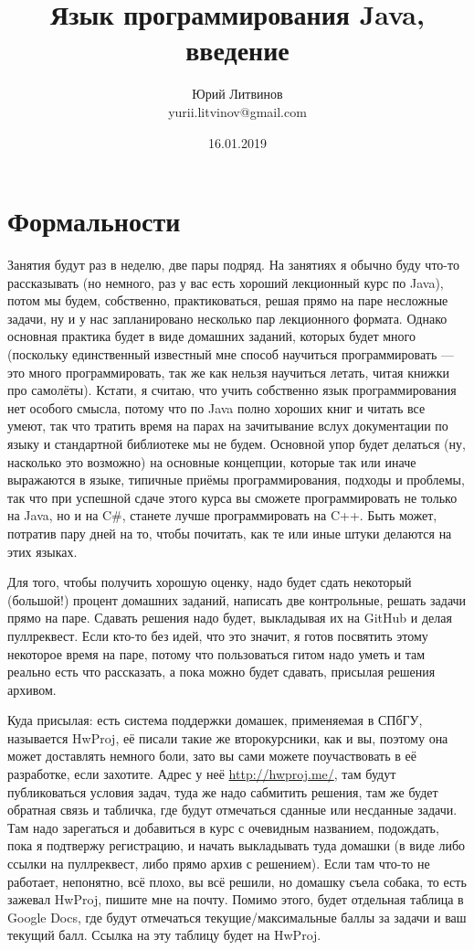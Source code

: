 \documentclass[a5paper]{article}
\title{Язык программирования Java, введение}
\author{Юрий Литвинов\\\small{yurii.litvinov@gmail.com}}
\date{16.01.2019}
\begin{document}
\maketitle
\thispagestyle{empty}

\section{Формальности}

Занятия будут раз в неделю, две пары подряд. На занятиях я обычно буду что-то рассказывать (но немного, раз у вас есть хороший лекционный курс по Java), потом мы будем, собственно, практиковаться, решая прямо на паре несложные задачи, ну и у нас запланировано несколько пар лекционного формата. Однако основная практика будет в виде домашних заданий, которых будет много (поскольку единственный известный мне способ научиться программировать --- это много программировать, так же как нельзя научиться летать, читая книжки про самолёты). Кстати, я считаю, что учить собственно язык программирования нет особого смысла, потому что по Java полно хороших книг и читать все умеют, так что тратить время на парах на зачитывание вслух документации по языку и стандартной библиотеке мы не будем. Основной упор будет делаться (ну, насколько это возможно) на основные концепции, которые так или иначе выражаются в языке, типичные приёмы программирования, подходы и проблемы, так что при успешной сдаче этого курса вы сможете программировать не только на Java, но и на C\#, станете лучше программировать на C++. Быть может, потратив пару дней на то, чтобы почитать, как те или иные штуки делаются на этих языках.

Для того, чтобы получить хорошую оценку, надо будет сдать некоторый (большой!) процент домашних заданий, написать две контрольные, решать задачи прямо на паре. Сдавать решения надо будет, выкладывая их на GitHub и делая пуллреквест. Если кто-то без идей, что это значит, я готов посвятить этому некоторое время на паре, потому что пользоваться гитом надо уметь и там реально есть что рассказать, а пока можно будет сдавать, присылая решения архивом. 

Куда присылая: есть система поддержки домашек, применяемая в СПбГУ, называется HwProj, её писали такие же второкурсники, как и вы, поэтому она может доставлять немного боли, зато вы сами можете поучаствовать в её разработке, если захотите. Адрес у неё \url{http://hwproj.me/}, там будут публиковаться условия задач, туда же надо сабмитить решения, там же будет обратная связь и табличка, где будут отмечаться сданные или несданные задачи. Там надо зарегаться и добавиться в курс с очевидным названием, подождать, пока я подтвержу регистрацию, и начать выкладывать туда домашки (в виде либо ссылки на пуллреквест, либо прямо архив с решением). Если там что-то не работает, непонятно, всё плохо, вы всё решили, но домашку съела собака, то есть зажевал HwProj, пишите мне на почту. Помимо этого, будет отдельная таблица в Google Docs, где будут отмечаться текущие/максимальные баллы за задачи и ваш текущий балл. Ссылка на эту таблицу будет на HwProj.
\end{document}
